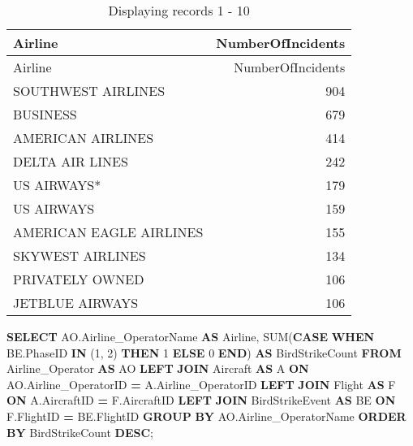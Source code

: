 \documentclass[
]{article}
\newenvironment{Shaded}{\begin{snugshade}}{\end{snugshade}}
\newcommand{\ControlFlowTok}[1]{\textcolor[rgb]{0.13,0.29,0.53}{\textbf{#1}}}
\newcommand{\DecValTok}[1]{\textcolor[rgb]{0.00,0.00,0.81}{#1}}
\newcommand{\FunctionTok}[1]{\textcolor[rgb]{0.00,0.00,0.00}{#1}}
\newcommand{\KeywordTok}[1]{\textcolor[rgb]{0.13,0.29,0.53}{\textbf{#1}}}
\newcommand{\NormalTok}[1]{#1}
\newcommand{\OperatorTok}[1]{\textcolor[rgb]{0.81,0.36,0.00}{\textbf{#1}}}
\begin{document}
\begin{longtable}[]{@{}lr@{}}
\caption{Displaying records 1 - 10}\tabularnewline
\toprule()
Airline & NumberOfIncidents \\
\midrule()
\endfirsthead
\toprule()
Airline & NumberOfIncidents \\
\midrule()
\endhead
SOUTHWEST AIRLINES & 904 \\
BUSINESS & 679 \\
AMERICAN AIRLINES & 414 \\
DELTA AIR LINES & 242 \\
US AIRWAYS* & 179 \\
US AIRWAYS & 159 \\
AMERICAN EAGLE AIRLINES & 155 \\
SKYWEST AIRLINES & 134 \\
PRIVATELY OWNED & 106 \\
JETBLUE AIRWAYS & 106 \\
\bottomrule()
\end{longtable}

\begin{Shaded}
\begin{Highlighting}[]

\KeywordTok{SELECT}\NormalTok{ AO.Airline\_OperatorName }\KeywordTok{AS}\NormalTok{ Airline,}
       \FunctionTok{SUM}\NormalTok{(}\ControlFlowTok{CASE} \ControlFlowTok{WHEN}\NormalTok{ BE.PhaseID }\KeywordTok{IN}\NormalTok{ (}\DecValTok{1}\NormalTok{, }\DecValTok{2}\NormalTok{) }\ControlFlowTok{THEN} \DecValTok{1} \ControlFlowTok{ELSE} \DecValTok{0} \ControlFlowTok{END}\NormalTok{) }\KeywordTok{AS}\NormalTok{ BirdStrikeCount}
\KeywordTok{FROM}\NormalTok{ Airline\_Operator }\KeywordTok{AS}\NormalTok{ AO}
\KeywordTok{LEFT} \KeywordTok{JOIN}\NormalTok{ Aircraft }\KeywordTok{AS}\NormalTok{ A }\KeywordTok{ON}\NormalTok{ AO.Airline\_OperatorID }\OperatorTok{=}\NormalTok{ A.Airline\_OperatorID}
\KeywordTok{LEFT} \KeywordTok{JOIN}\NormalTok{ Flight }\KeywordTok{AS}\NormalTok{ F }\KeywordTok{ON}\NormalTok{ A.AircraftID }\OperatorTok{=}\NormalTok{ F.AircraftID}
\KeywordTok{LEFT} \KeywordTok{JOIN}\NormalTok{ BirdStrikeEvent }\KeywordTok{AS}\NormalTok{ BE }\KeywordTok{ON}\NormalTok{ F.FlightID }\OperatorTok{=}\NormalTok{ BE.FlightID}
\KeywordTok{GROUP} \KeywordTok{BY}\NormalTok{ AO.Airline\_OperatorName}
\KeywordTok{ORDER} \KeywordTok{BY}\NormalTok{ BirdStrikeCount }\KeywordTok{DESC}\NormalTok{;}
\end{Highlighting}
\end{Shaded}
\end{document}
